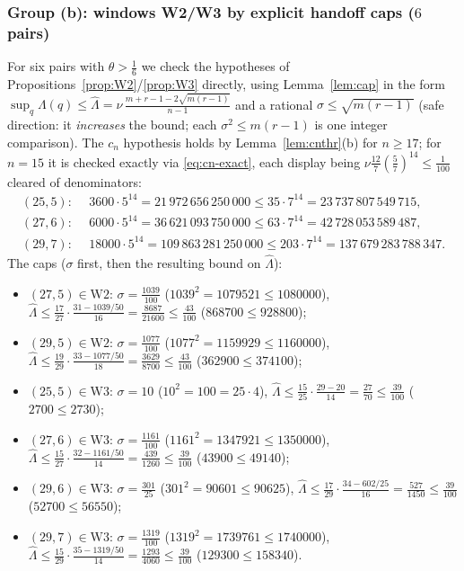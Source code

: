 \documentclass[11pt]{article}
\theoremstyle{remark}
\theoremstyle{plain}
\theoremstyle{plain}
\newcommand{\Lhat}{\widehat\Lambda}
\begin{document}
\subsubsection{Group (b): windows W2/W3 by explicit handoff caps ($6$ pairs)}\label{sec:grpB}
For six pairs with $\theta>\tfrac16$ we check the hypotheses of Propositions~\ref{prop:W2}/\ref{prop:W3} directly, using Lemma~\ref{lem:cap} in the form $\sup_q\Lambda(q)\le\Lhat=\nu\,\frac{m+r-1-2\sqrt{m(r-1)}}{n-1}$ and a rational $\sigma\le\sqrt{m(r-1)}$ (safe direction: it \emph{increases} the bound; each $\sigma^2\le m(r-1)$ is one integer comparison).  The $c_n$ hypothesis holds by Lemma~\ref{lem:cnthr}(b) for $n\ge17$; for $n=15$ it is checked exactly via \eqref{eq:cn-exact}, each display being $\nu\frac{12}7(\tfrac57)^{14}\le\tfrac1{100}$ cleared of denominators:
\begin{equation}\label{eq:c15}
\begin{aligned}
        (25,5):&\ \ 3600\cdot5^{14}=21\,972\,656\,250\,000
                \le35\cdot7^{14}=23\,737\,807\,549\,715,\\
        (27,6):&\ \ 6000\cdot5^{14}=36\,621\,093\,750\,000
                \le63\cdot7^{14}=42\,728\,053\,589\,487,\\
        (29,7):&\ \ 18000\cdot5^{14}=109\,863\,281\,250\,000
                \le203\cdot7^{14}=137\,679\,283\,788\,347.
\end{aligned}
\end{equation}
The caps ($\sigma$ first, then the resulting bound on $\Lhat$):
\begin{itemize}[leftmargin=2em]
\item $(27,5)\in\mathrm{W2}$: $\sigma=\tfrac{1039}{100}$ ($1039^2=1079521\le1080000$),\quad
 $\Lhat\le\tfrac{17}{27}\cdot\tfrac{31-1039/50}{16}=\tfrac{8687}{21600}\le\tfrac{43}{100}$ ($868700\le928800$);
\item $(29,5)\in\mathrm{W2}$: $\sigma=\tfrac{1077}{100}$ ($1077^2=1159929\le1160000$),\quad
 $\Lhat\le\tfrac{19}{29}\cdot\tfrac{33-1077/50}{18}=\tfrac{3629}{8700}\le\tfrac{43}{100}$ ($362900\le374100$);
\item $(25,5)\in\mathrm{W3}$: $\sigma=10$ ($10^2=100=25\cdot4$),\quad
 $\Lhat\le\tfrac{15}{25}\cdot\tfrac{29-20}{14}=\tfrac{27}{70}\le\tfrac{39}{100}$ ($2700\le2730$);
\item $(27,6)\in\mathrm{W3}$: $\sigma=\tfrac{1161}{100}$ ($1161^2=1347921\le1350000$),\quad
 $\Lhat\le\tfrac{15}{27}\cdot\tfrac{32-1161/50}{14}=\tfrac{439}{1260}\le\tfrac{39}{100}$ ($43900\le49140$);
\item $(29,6)\in\mathrm{W3}$: $\sigma=\tfrac{301}{25}$ ($301^2=90601\le90625$),\quad
 $\Lhat\le\tfrac{17}{29}\cdot\tfrac{34-602/25}{16}=\tfrac{527}{1450}\le\tfrac{39}{100}$ ($52700\le56550$);
\item $(29,7)\in\mathrm{W3}$: $\sigma=\tfrac{1319}{100}$ ($1319^2=1739761\le1740000$),\quad
 $\Lhat\le\tfrac{15}{29}\cdot\tfrac{35-1319/50}{14}=\tfrac{1293}{4060}\le\tfrac{39}{100}$ ($129300\le158340$).
\end{itemize}
\end{document}
